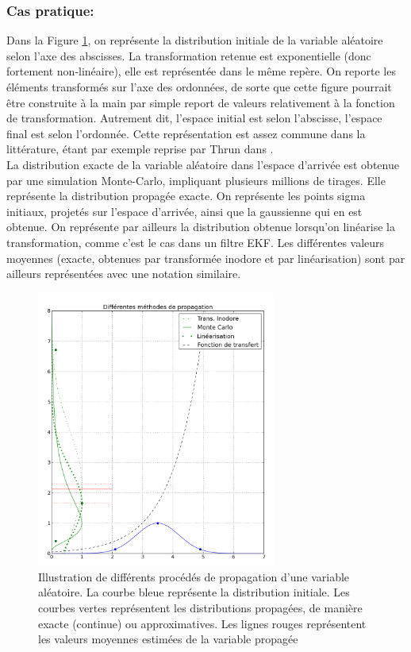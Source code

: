 \subsubsection{Cas pratique:}
Dans la Figure \ref{fig:ch4_transformation_evaluation}, on représente la distribution initiale de la variable aléatoire selon l'axe des abscisses. La transformation retenue est exponentielle (donc fortement non-linéaire), elle est représentée dans le même repère. On reporte les éléments transformés sur l'axe des ordonnées, de sorte que cette figure pourrait être construite à la main par simple report de valeurs relativement à la fonction de transformation. Autrement dit, l'espace initial est selon l'abscisse, l'espace final est selon l'ordonnée. Cette représentation est assez commune dans la littérature, étant par exemple reprise par Thrun dans \cite{Thrun2000}.\\
La distribution exacte de la variable aléatoire dans l'espace d'arrivée est obtenue par une simulation \og Monte-Carlo\fg{}, impliquant plusieurs millions de tirages. Elle représente la distribution propagée exacte. On représente les points sigma initiaux, projetés sur l'espace d'arrivée, ainsi que la gaussienne qui en est obtenue. On représente par ailleurs la distribution obtenue lorsqu'on linéarise la transformation, comme c'est le cas dans un filtre EKF. Les différentes valeurs moyennes (exacte, obtenues par transformée inodore et par linéarisation) sont par ailleurs représentées avec une notation similaire.

\begin{figure} 
	\centering
	\includegraphics[width=0.7\textwidth]{Chapter4/graphics/unscented_transform.png}
	\caption{Illustration de différents procédés de propagation d'une variable aléatoire. La courbe bleue représente la distribution initiale. Les courbes vertes représentent les distributions propagées, de manière exacte (continue) ou approximatives. Les lignes rouges représentent les valeurs moyennes estimées de la variable propagée}
	\label{fig:ch4_transformation_evaluation}
\end{figure}

